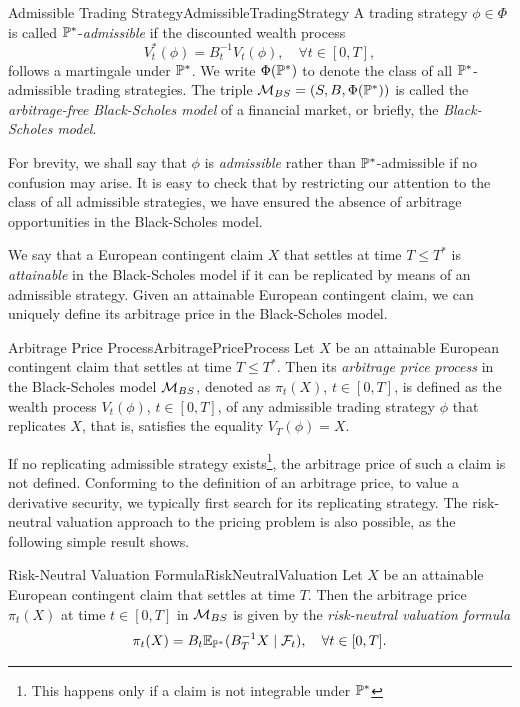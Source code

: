 \begin{defn}{Admissible Trading Strategy}{AdmissibleTradingStrategy}
	A trading strategy \(\phi \in \Phi\) is called \(\mathbb{P}^*\)-\textit{admissible} if the discounted wealth process
	\[
		V_t^*(\phi) = B_t^{-1} V_t(\phi), \quad \forall t \in [0, T],
	\]
	follows a martingale under \(\mathbb{P}^*\). We write \(\Phi(\mathbb{P}^*)\) to denote the class of all \(\mathbb{P}^*\)-admissible trading strategies. The triple \(\mathcal{M}_{BS} = (S, B, \Phi(\mathbb{P}^*))\) is called the \textit{arbitrage-free Black-Scholes model} of a financial market, or briefly, the \textit{Black-Scholes model}.
\end{defn}

For brevity, we shall say that \(\phi\) is \textit{admissible} rather than \(\mathbb{P}^*\)-admissible if no confusion may arise. It is easy to check that by restricting our attention to the class of all admissible strategies, we have ensured the absence of arbitrage opportunities in the Black-Scholes model.

We say that a European contingent claim \(X\) that settles at time \(T \leq T^*\) is \textit{attainable} in the Black-Scholes model if it can be replicated by means of an admissible strategy. Given an attainable European contingent claim, we can uniquely define its arbitrage price in the Black-Scholes model.

\begin{defn}{Arbitrage Price Process}{ArbitragePriceProcess}
	Let \(X\) be an attainable European contingent claim that settles at time \(T \leq T^*\). Then its \textit{arbitrage price process} in the Black-Scholes model \(\mathcal{M}_{BS}\), denoted as \(\pi_t(X)\), \(t \in [0, T]\), is defined as the wealth process \(V_t(\phi)\), \(t \in [0, T]\), of any admissible trading strategy \(\phi\) that replicates \(X\), that is, satisfies the equality \(V_T(\phi) = X\).
\end{defn}

If no replicating admissible strategy exists\footnote{This happens only if a claim is not integrable under \(\mathbb{P}^*\)}, the arbitrage price of such a claim is not defined. Conforming to the definition of an arbitrage price, to value a derivative security, we typically first search for its replicating strategy. The risk-neutral valuation approach to the pricing problem is also possible, as the following simple result shows.

\begin{cor}{Risk-Neutral Valuation Formula}{RiskNeutralValuation}
	Let \(X\) be an attainable European contingent claim that settles at time \(T\). Then the arbitrage price \(\pi_t(X)\) at time \(t \in [0, T]\) in \(\mathcal{M}_{BS}\) is given by the \textit{risk-neutral valuation formula}
	\begin{equation}
		\pi_t(X) = B_t \mathbb{E}_{\mathbb{P}^*}(B_T^{-1} X \mid \mathcal{F}_t), \quad \forall t \in [0, T].
	\end{equation}
\end{cor}



